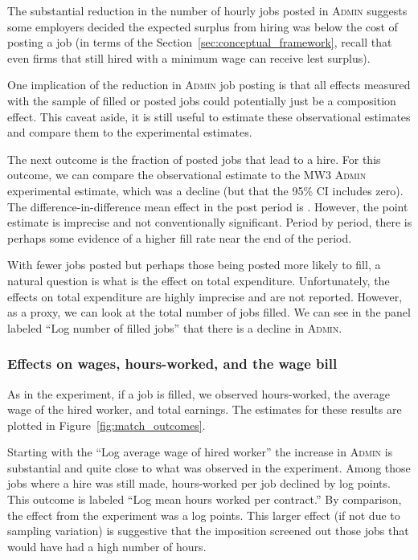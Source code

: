 \documentclass[AER]{AEA}
\newcommand{\admin}{\textsc{Admin}}
\begin{document}
The substantial reduction in the number of hourly jobs posted in \admin{} suggests some employers decided the expected surplus from hiring was below the cost of posting a job (in terms of the Section~\ref{sec:conceptual_framework}, recall that even firms that still hired with a minimum wage can receive lest surplus).

One implication of the reduction in \admin{} job posting is that all effects measured with the sample of filled or posted jobs could potentially just be a composition effect.
This caveat aside, it is still useful to estimate these observational estimates and compare them to the experimental estimates.

The next outcome is the fraction of posted jobs that lead to a hire.
For this outcome, we can compare the observational estimate to the MW3 \admin{} experimental estimate, which was a \ADMINThreeItotalchargegtZeroeffects{} decline (but that the 95\% CI includes zero).
The difference-in-difference mean effect in the post period is \DIDfillrate{}.
However, the point estimate is imprecise and not conventionally significant.
Period by period, there is perhaps some evidence of a higher fill rate near the end of the period.

With fewer jobs posted but perhaps those being posted more likely to fill, a natural question is what is the effect on total expenditure.
Unfortunately, the effects on total expenditure are highly imprecise and are not reported.
However, as a proxy, we can look at the total number of jobs filled.
We can see in the panel labeled ``Log number of filled jobs'' that there is a decline in \admin{}.

\subsubsection{Effects on wages, hours-worked, and the wage bill}
As in the experiment, if a job is filled, we observed hours-worked, the average wage of the hired worker, and total earnings.
The estimates for these results are plotted in Figure~\ref{fig:match_outcomes}.

Starting with the ``Log average wage of hired worker'' the increase in \admin{} is substantial and quite close to what was observed in the experiment.
Among those jobs where a hire was still made, hours-worked per job declined by \DIDhours{} log points.
This outcome is labeled ``Log mean hours worked per contract.'' 
By comparison, the effect from the experiment was a \ADMINThreeloghourseffects{} log points.
This larger effect (if not due to sampling variation) is suggestive that the imposition screened out those jobs that would have had a high number of hours.
\end{document}
